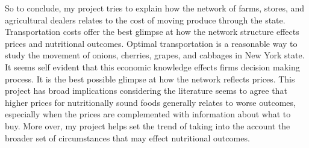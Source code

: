 \documentclass{report}
\begin{document}
So to conclude, my project tries to explain how the network of farms, stores, and agricultural dealers relates to the cost of moving produce through the state. Transportation costs offer the best glimpse at how the network structure effects prices and nutritional outcomes.  Optimal transportation is a reasonable way to study the movement of onions, cherries, grapes, and cabbages in New York state. It seems self evident that this economic knowledge effects firms decision making process. It is the best possible glimpse at how the network reflects prices. This project has broad implications considering the literature seems to agree that higher prices for nutritionally sound foods generally relates to worse outcomes, especially when the prices are complemented with information about what to buy. More over, my project helps set the trend of taking into the account the broader set of circumstances that may effect nutritional outcomes. 

\pagebreak
\end{document}
